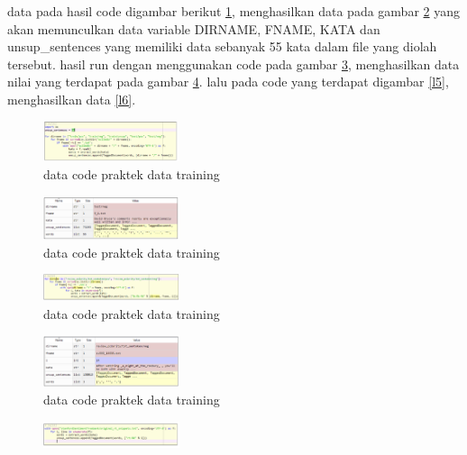 \begin{enumerate}
        data pada hasil code digambar berikut \ref{l1}, menghasilkan data pada gambar \ref{l2} yang akan memunculkan data variable DIRNAME, FNAME, KATA dan unsup\_sentences yang memiliki data sebanyak 55 kata dalam file yang diolah tersebut. hasil run dengan menggunakan code pada gambar \ref{l3}, menghasilkan data nilai yang terdapat pada gambar \ref{l4}. lalu pada code yang terdapat digambar \ref{l5}, menghasilkan data \ref{l6}.
        \begin{figure}[H]
            \includegraphics[width=4cm]{figures/1174039/chapter5/17.png}
            \centering
            \caption{data code praktek data training }
            \label{l1}
        \end{figure}
        \begin{figure}[H]
            \includegraphics[width=4cm]{figures/1174039/chapter5/18.png}
            \centering
            \caption{data code praktek data training }
            \label{l2}
        \end{figure}
        \begin{figure}[H]
            \includegraphics[width=4cm]{figures/1174039/chapter5/19.png}
            \centering
            \caption{data code praktek data training }
            \label{l3}
        \end{figure}
        \begin{figure}[H]
            \includegraphics[width=4cm]{figures/1174039/chapter5/20.png}
            \centering
            \caption{data code praktek data training }
            \label{l4}
        \end{figure}
        \begin{figure}[H]
            \includegraphics[width=4cm]{figures/1174039/chapter5/21.png}

\end{figure}
\end{enumerate}
